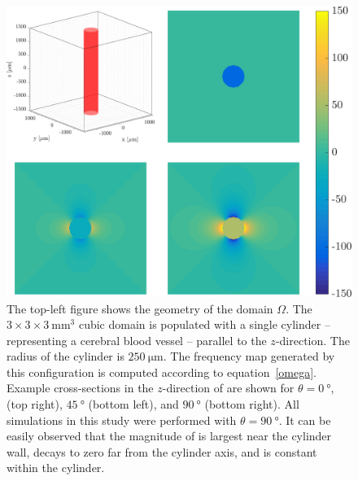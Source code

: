 \documentclass[twocolumn,twoside]{article}
\begin{document}
\begin{figure}[H]
    \centering
    \begin{minipage}{\textwidth}
    \centering
    \includegraphics[keepaspectratio=true,width=\textwidth]{figures/Geometry}
    \caption{The top-left figure shows the geometry of the domain $\Omega$.
      The $3\times 3\times \SI{3}{\milli\meter^3}$
      cubic domain is populated with a single cylinder -- representing a cerebral blood vessel -- parallel to the $z$-direction.
      The radius of the cylinder is $\SI{250}{\micro\meter}$.
      The frequency map \ww{} generated by this configuration is computed according to equation~\eqref{omega}.
      Example cross-sections in the $z$-direction of \ww{} are shown for $\theta = \SI{0}{\degree}$, (top
      right), $\SI{45}{\degree}$ (bottom left), and $\SI{90}{\degree}$ (bottom right).
      All simulations in this study were performed with $\theta = \SI{90}{\degree}$.
      It can be easily observed that the magnitude of \ww{} is largest near the cylinder wall, decays to zero far from the cylinder axis, and is constant within the cylinder.}
    \label{fig:geometry}
    \end{minipage}
\end{figure}
\end{document}
